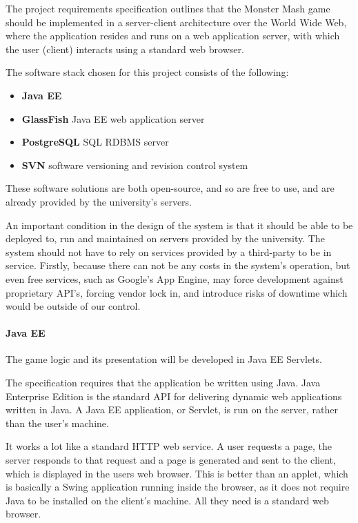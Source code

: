 \documentclass{article}
\begin{document}
The project requirements specification outlines that the Monster Mash game should be implemented in a server-client architecture over the World Wide Web, where the application resides and runs on a web application server, with which the user (client) interacts using a standard web browser.


The software stack chosen for this project consists of the following:
\begin{itemize}
\item \textbf{Java EE}
\item \textbf{GlassFish} Java EE web application server
\item \textbf{PostgreSQL} SQL RDBMS server
\item \textbf{SVN} software versioning and revision control system
\end{itemize}

These software solutions are both open-source, and so are free to use, and are already provided by the university's servers.

An important condition in the design of the system is that it should be able to be deployed to, run and maintained on servers provided by the university. The system should not have to rely on services provided by a third-party to be in service. Firstly, because there can not be any costs in the system's operation, but even free services, such as Google's App Engine, may force development against proprietary API's, forcing vendor lock in, and introduce risks of downtime which would be outside of our control.

\paragraph{Java EE}

The game logic and its presentation will be developed in Java EE Servlets.

The specification requires that the application be written using Java.
Java Enterprise Edition is the standard API for delivering dynamic web applications written in Java. A Java EE application, or Servlet, is run on the server, rather than the user's machine.

It works a lot like a standard HTTP web service. A user requests a page, the server responds to that request and a page is generated and sent to the client, which is displayed in the users web browser.
This is better than an applet, which is basically a Swing application running inside the browser, as it does not require Java to be installed on the client's machine. All they need is a standard web browser.
\end{document}
